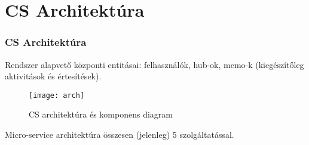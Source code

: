 \section{CS Architektúra}

\begin{frame}
    \frametitle{CS Architektúra}

    \begin{center}
        Rendszer alapvető központi entitásai: felhasználók, hub-ok, memo-k (kiegészítőleg aktivitások és értesítések).
    \end{center}

    \begin{figure}[htbp]
        \centering
        \texttt{[image: arch]}
        \caption{CS architektúra és komponens diagram}
    \end{figure}

    \begin{center}
        Micro-service architektúra összesen (jelenleg) 5 szolgáltatással.
    \end{center}
\end{frame}